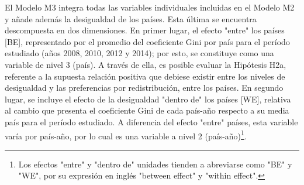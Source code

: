 \documentclass[12pt,letterpaper]{article}
\begin{document}
El Modelo M3 integra todas las variables individuales incluidas en el Modelo M2 y añade además la desigualdad de los países. Esta última se encuentra descompuesta en dos dimensiones. En primer lugar, el efecto "entre" los países [BE], representado por el promedio del coeficiente Gini por país para el período estudiado (años 2008, 2010, 2012 y 2014); por esto, se constituye como una variable de nivel 3 (país). A través de ella, es posible evaluar la Hipótesis H2a, referente a la supuesta relación positiva que debiese existir entre los niveles de desigualdad y las preferencias por redistribución, entre los países. En segundo lugar, se incluye el efecto de la desigualdad "dentro de" los países [WE], relativa al cambio que presenta el coeficiente Gini de cada país-año respecto a su media país para el período estudiado. A diferencia del efecto "entre" países, esta variable varía por país-año, por lo cual es una variable a nivel 2 (país-año)\footnote{Los efectos "entre" y "dentro de" unidades tienden a abreviarse como "BE" y "WE", por su expresión en inglés "between effect" y "within effect".}.
\end{document}
